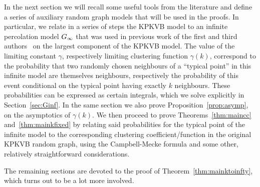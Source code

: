 In the next section we will recall some useful tools from the literature and define a series of auxiliary random graph models that will be used in the proofs. In particular, we relate in a series of steps the KPKVB model to an infinite percolation model $G_{\infty}$ that was used in previous work of the first and third authors~\cite{fountoulakis2018law} on the largest component of the KPKVB model. The value of the limiting constant $\gamma$, respectively limiting clustering function $\gamma(k)$, correspond to the probability that two randomly chosen neighbours of a ``typical point'' in this infinite model are themselves neighbours, respectively the probability of this event conditional on the typical point having exactly $k$ neighbours. These probabilities can be expressed as certain integrals, which we solve explicitly in Section~\ref{sec:Ginf}. 
In the same section we also prove Proposition~\ref{prop:asymp}, on the asymptotics of $\gamma(k)$. We then proceed to prove Theorems~\ref{thm:maincc} and~\ref{thm:mainkfixed} by relating said probabilities for the typical point of the infinite model to the corresponding clustering coefficient/function in the original KPKVB random graph, using the Campbell-Mecke formula and some other, relatively straightforward considerations.

The remaining sections are devoted to the proof of Theorem~\ref{thm:mainktoinfty}, which turns out to be a lot more involved. 

